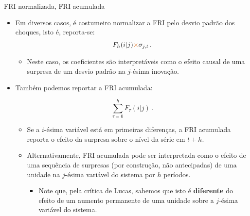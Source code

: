 \documentclass[11pt]{beamer}
\begin{document}
\begin{frame}{FRI normalizada, FRI acumulada}
\begin{itemize}
	\item Em diversos casos, é costumeiro normalizar a FRI pelo desvio padrão dos choques, isto é, reporta-se:
	$$F_h(i|j){\color{red}\times} \sigma_{j,t}\,.$$
	
	\begin{itemize}
		\item 	Neste caso, os coeficientes são interpretáveis como o efeito causal de uma surpresa de um desvio padrão na $j$-ésima inovação.
	\end{itemize}
	\item Também podemos reportar a FRI acumulada:
	
	$$\sum_{\tau=0}^h F_\tau(i|j)\, .$$
	
	\begin{itemize}
		\item Se a $i$-ésima variável está em primeiras diferenças, a FRI acumulada reporta o efeito da surpresa sobre o nível da série em $t+h$.
		\item Alternativamente, FRI acumulada pode ser interpretada como o efeito de uma sequência de surpresas (por construção, não antecipadas) de uma unidade na $j$-ésima variável do sistema por $h$ períodos.
		\begin{itemize}
			\item Note que, pela crítica de Lucas, sabemos que isto é \textbf{diferente} do efeito de um aumento permanente de uma unidade sobre a $j$-ésima variável do sistema.
		\end{itemize}
	\end{itemize}
	
\end{itemize}
\end{frame}
\end{document}
